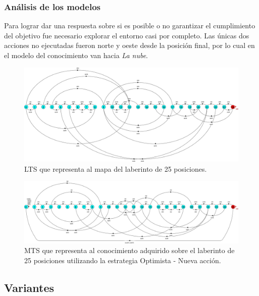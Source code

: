 \clearpage

\subsubsection{Análisis de los modelos}

Para lograr dar una respuesta sobre si es posible o no garantizar el cumplimiento del objetivo fue necesario 
explorar el entorno casi por completo. Las únicas dos acciones no ejecutadas fueron norte y oeste desde la posición 
final, por lo cual en el modelo del conocimiento van hacia \textit{La nube}.

\begin{figure}[H]
	\centering
		\includegraphics[width=1.0\textwidth]{Imagenes/Laberintos/25_view.jpg}
	\caption{LTS que representa al mapa del laberinto de 25 posiciones.}
	\label{fig:25_view}
\end{figure}

\begin{figure}[H]
	\centering
		\includegraphics[width=1.0\textwidth]{Imagenes/Laberintos/25_knowledge.jpg}
	\caption{MTS que representa al conocimiento adquirido sobre el laberinto de 25 posiciones utilizando la estrategia Optimista - Nueva acción.}
	\label{fig:25_knowledge}
\end{figure}

\clearpage

\subsection{Variantes}

